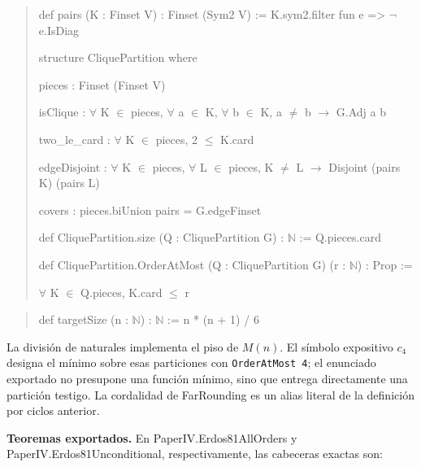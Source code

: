 \documentclass[spanish,11pt,a4paper]{article}
\begin{document}
\begin{quote}\footnotesize\ttfamily\raggedright
def pairs (K : Finset V) : Finset (Sym2 V) := K.sym2.filter fun e => \(\neg\) e.IsDiag\par
\par
structure CliquePartition where\par
  pieces : Finset (Finset V)\par
  isClique : \(\forall\) K \(\in\) pieces, \(\forall\) a \(\in\) K, \(\forall\) b \(\in\) K, a \(\ne\) b \(\to\) G.Adj a b\par
  two\_le\_card : \(\forall\) K \(\in\) pieces, 2 \(\le\) K.card\par
  edgeDisjoint : \(\forall\) K \(\in\) pieces, \(\forall\) L \(\in\) pieces, K \(\ne\) L \(\to\) Disjoint (pairs K) (pairs L)\par
  covers : pieces.biUnion pairs = G.edgeFinset\par
\par
def CliquePartition.size (Q : CliquePartition G) : \(\mathbb N\) := Q.pieces.card\par
\par
def CliquePartition.OrderAtMost (Q : CliquePartition G) (r : \(\mathbb N\)) : Prop :=\par
  \(\forall\) K \(\in\) Q.pieces, K.card \(\le\) r\par
\end{quote}

\begin{quote}\footnotesize\ttfamily\raggedright
def targetSize (n : \(\mathbb N\)) : \(\mathbb N\) := n * (n + 1) / 6\par
\end{quote}

La división de naturales implementa el piso de \(M(n)\). El símbolo expositivo \(c_4\) designa el mínimo sobre esas particiones con \texttt{OrderAtMost\ 4}; el enunciado exportado no presupone una función mínimo, sino que entrega directamente una partición testigo. La cordalidad de {\ttfamily\small FarRounding} es un alias literal de la definición por ciclos anterior.

\textbf{Teoremas exportados.} En {\ttfamily\small PaperIV.\discretionary{\hbox{\ensuremath{\hookrightarrow}}}{}{}Erdos81AllOr\discretionary{\hbox{\ensuremath{\hookrightarrow}}}{}{}ders} y {\ttfamily\small PaperIV.\discretionary{\hbox{\ensuremath{\hookrightarrow}}}{}{}Erdos81Uncon\discretionary{\hbox{\ensuremath{\hookrightarrow}}}{}{}ditional}, respectivamente, las cabeceras exactas son:
\end{document}
